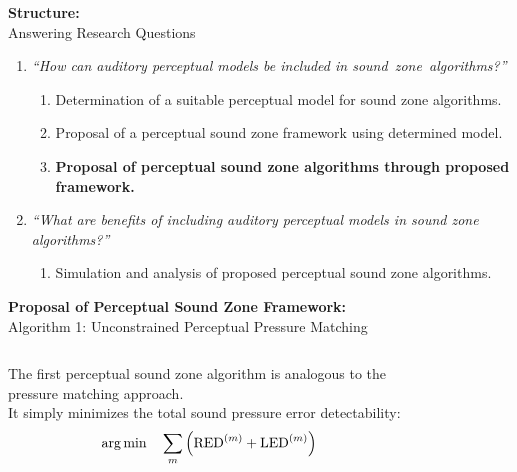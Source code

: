 \documentclass[aspectratio=169]{beamer}
\begin{document}
\begin{frame}{\textbf{Structure:}\\ Answering Research Questions}
    \begin{enumerate}
        \item {\textit{``How can auditory perceptual models be included in sound~zone~algorithms?''}}
            \vspace{7pt}
            \begin{enumerate}
                \item Determination of a suitable perceptual model for sound zone algorithms.
                \vspace{7pt}
                \item Proposal of a perceptual sound zone framework using determined model. 
                \vspace{7pt}
                \item \textbf{Proposal of perceptual sound zone algorithms through proposed framework.}
                \vspace{7pt}
            \end{enumerate}
        \item {\textit{``What are benefits of including auditory perceptual models in sound zone algorithms?''}}
            \vspace{-5pt}
            \begin{enumerate}
                \item Simulation and analysis of proposed perceptual sound zone algorithms.
            \end{enumerate}
    \end{enumerate}
\end{frame}

\begin{frame}{\textbf{Proposal of Perceptual Sound Zone Framework:}\\ Algorithm 1: Unconstrained Perceptual Pressure
    Matching}
    \begin{columns}[c]
        The first perceptual sound zone algorithm is analogous to the pressure matching approach.\\
        \vspace{7pt}
        It simply minimizes the total sound pressure error detectability:
        \begin{equation}
            \operatorname*{arg\,min}_{}\quad \sum_m \left(\text{RED}^{(m)} + \text{LED}^{(m)}\right)
        \end{equation}
        \begin{figure}[]
            \centering
            \scalebox{0.7}{}
        \end{figure}
    \end{columns}
\end{frame}
\end{document}
